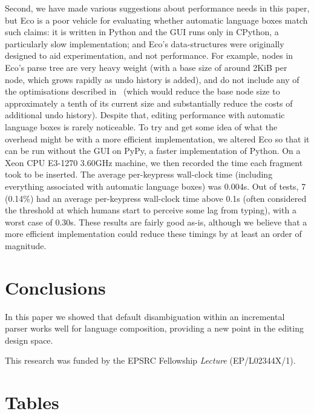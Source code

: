 \documentclass[sigplan,screen]{acmart}
\begin{document}
Second, we have made various suggestions about performance needs in this paper, but Eco is
a poor vehicle for evaluating whether automatic language boxes match such claims:
it is written in Python and the GUI runs only
in CPython, a particularly slow implementation; and Eco's data-structures
were originally designed to aid experimentation, and not performance. For example, nodes in Eco's
parse tree are very heavy weight (with a base size of around 2KiB per node, which grows
rapidly as undo history is added), and do not include any of the optimisations
described in~\citet{wagner98practicalalgorithms} (which would reduce the
base node size to approximately a tenth of its current size and substantially reduce the costs of
additional undo history). Despite that, editing performance with automatic
language boxes is rarely noticeable. To try and get some idea of what the
overhead might be with a more efficient implementation, we altered Eco so that
it can be run without the GUI on PyPy, a faster implementation of Python. On a
Xeon CPU E3-1270 3.60GHz machine, we then recorded the time each fragment took
to be inserted. The average per-keypress wall-clock time (including everything
associated with automatic language boxes) was 0.004s. Out of \totalinsertions tests,
7 (0.14\%) had an average per-keypress wall-clock time above 0.1s (often
considered the threshold at which humans start to perceive some lag from
typing), with a worst case of 0.30s. These results are fairly good as-is,
although we believe that a more efficient implementation could reduce these
timings by at least an order of magnitude.


\section{Conclusions}

In this paper we showed that default disambiguation within an
incremental parser works well for language composition, providing a new point
in the editing design space.


\begin{acks}
This research was funded by the EPSRC Fellowship \emph{Lecture} (EP/L02344X/1).
\end{acks}




\iffalse
\appendix
\clearpage
\onecolumn

\section{Tables}
\label{apdx:tables}
\end{document}
